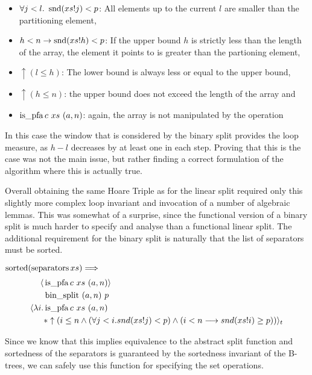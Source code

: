 \begin{itemize}
    \item $\forall j<l.\ \operatorname{snd} (xs!j) < p$: All elements up to the current $l$
        are smaller than the partitioning element,
    \item $h<n \rightarrow \operatorname{snd} (xs!h) < p$: If the upper bound $h$
    is strictly less than the length of the array,
    the element it points to is greater than the partioning element,
    \item $\uparrow(l \leq h)$: The lower bound is always less or equal to the upper bound,
    \item $\uparrow(h \leq n)$: the upper bound does not exceed the length of the array and
    \item $\operatorname{is\_pfa} c\ xs\ (a,n)$: again, the array is not manipulated by the operation
\end{itemize}

In this case the window that is considered by the binary split
provides the loop measure, as $h-l$ decreases by at least one in each step.
Proving that this is the case was not the main issue,
but rather finding a correct formulation of the algorithm
where this is actually true.

Overall obtaining the same Hoare Triple
as for the linear split required only
this slightly more complex loop invariant
and invocation of a number of algebraic lemmas.
This was somewhat of a surprise, since the functional
version of a binary split is much harder to
specify and analyse than a functional linear split.
The additional requirement for the binary split is
naturally that the list of separators must be sorted.

\begin{lemma} $\operatorname{sorted} (\operatorname{separators} xs) \Longrightarrow$ \\
    \label{lem:imp-bin-split-ht}
    \begin{align*}
        \langle &\operatorname{is\_pfa} c\ xs\ (a,n)\rangle \\
                  &\operatorname{bin\_split}\ (a,n)\ p \\
        \langle \lambda i. & \operatorname{is\_pfa} c\ xs\ (a,n)\\
        &* \uparrow(i \leq n 
            \wedge (\forall j < i. snd (xs!j) < p) 
            \wedge (i<n \longrightarrow snd (xs!i) \geq p)) \rangle_t 
    \end{align*}
\end{lemma}

Since we know that this implies equivalence to the abstract split function
and sortedness of the separators is guaranteed by the sortedness
invariant of the B-trees,
we can safely use this function for specifying
the set operations.

